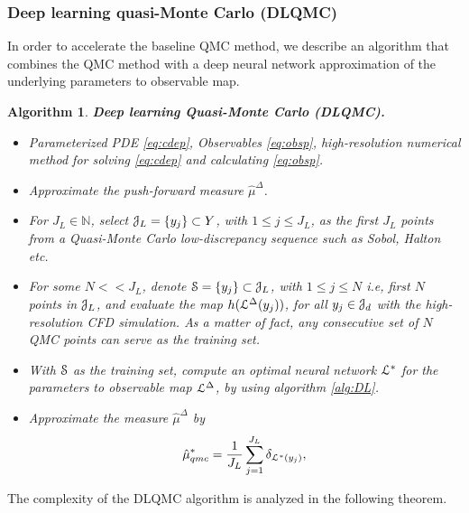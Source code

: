\documentclass[a4paper]{article}
\numberwithin{equation}{section}
\newtheorem{algorithm}[theorem]{Algorithm}
\numberwithin{equation}{section}
\theoremstyle{definition}
\theoremstyle{myremarkstyle}
\renewcommand{\leq}{\leqslant}
\newcommand{\N}{\mathbb{N}}
\newcommand{\map}{\EuScript{L}}
\newcommand{\train}{\EuScript{S}}
\newcommand{\JL}{\EuScript{J}_L}
\newcommand{\Jd}{\EuScript{J}_d}
\begin{document}
\subsubsection{Deep learning quasi-Monte Carlo (DLQMC)}
\label{sec:dlqmc}
In order to accelerate the baseline QMC method, we describe an algorithm that combines the QMC method with a deep neural network approximation of the underlying parameters to observable map.
\begin{algorithm}
\label{alg:dlqmc}
{\bf Deep learning Quasi-Monte Carlo (DLQMC).} 
\begin{itemize}
\item [{\bf Inputs:}] Parameterized PDE \eqref{eq:cdep}, Observables \eqref{eq:obsp}, high-resolution numerical method for solving \eqref{eq:cdep} and calculating \eqref{eq:obsp}. 
\item [{\bf Goal:}] Approximate the push-forward measure $\hat{\mu}^{\Delta}$.
\item [{\bf Step 1:}] For $J_L \in \N$, select $\JL = \{y_j\} \subset Y$, with $1 \leq j \leq J_L$, as the first $J_L$ points from a Quasi-Monte Carlo low-discrepancy sequence such as Sobol, Halton etc. 
\item [{\bf Step 2:}] For some $N << J_L$, denote $\train= \{y_j\} \subset \JL$, with $1 \leq j \leq N$ i.e, first $N$ points in $\JL$, and evaluate the map $h(\map^{\Delta}(y_j))$, for all $y_j \in \Jd$ with the high-resolution CFD simulation. As a matter of fact, any consecutive set of $N$ QMC points can serve as the training set. 
\item [{\bf Step 3:}]  With $\train$ as the training set,  compute an optimal neural network $\map^{\ast}$ for the parameters to
observable map $\map^{\Delta}$, by using algorithm \ref{alg:DL}.
\item [{\bf Step 4:}]  Approximate the measure $\hat{\mu}^{\Delta}$ by
\begin{equation}
\label{eq:dlqmc1}
\hat{\mu}^{\ast}_{qmc} = \frac{1}{J_L}\sum\limits_{j=1}^{J_L} \delta_{\map^{\ast}(y_j)},
\end{equation}
\end{itemize}
\end{algorithm}
The complexity of the DLQMC algorithm is analyzed in the following theorem. 
\end{document}
